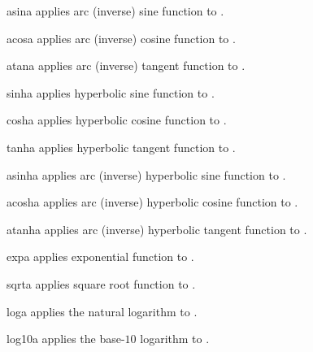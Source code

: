 \begin{funcdesc}{asin}{a}
applies arc (inverse) sine function to .
\end{funcdesc}

\begin{funcdesc}{acos}{a}
applies arc (inverse) cosine function to .
\end{funcdesc}

\begin{funcdesc}{atan}{a}
applies arc (inverse) tangent function to .
\end{funcdesc}

\begin{funcdesc}{sinh}{a}
applies hyperbolic sine function to .
\end{funcdesc}

\begin{funcdesc}{cosh}{a}
applies hyperbolic cosine function to .
\end{funcdesc}

\begin{funcdesc}{tanh}{a}
applies hyperbolic tangent function to .
\end{funcdesc}

\begin{funcdesc}{asinh}{a}
applies arc (inverse) hyperbolic sine function to .
\end{funcdesc}

\begin{funcdesc}{acosh}{a}
applies arc (inverse) hyperbolic cosine function to .
\end{funcdesc}

\begin{funcdesc}{atanh}{a}
applies arc (inverse) hyperbolic tangent function to .
\end{funcdesc}

\begin{funcdesc}{exp}{a}
applies exponential function to .
\end{funcdesc}

\begin{funcdesc}{sqrt}{a}
applies square root function to .
\end{funcdesc}

\begin{funcdesc}{log}{a}
applies the natural logarithm to .
\end{funcdesc}

\begin{funcdesc}{log10}{a}
applies the base-$10$ logarithm to .
\end{funcdesc}

